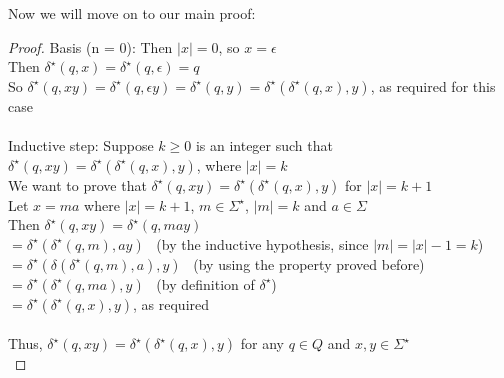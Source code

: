 \documentclass{article}
\begin{document}
Now we will move on to our main proof:
\begin{proof}
Basis (n = 0): Then $|x| = 0$, so $x = \epsilon$\\
Then $\delta^\star(q, x) = \delta^\star(q, \epsilon ) = q$\\
So $\delta^\star(q, xy) = \delta^\star(q, \epsilon y) = \delta^\star(q, y) = \delta^\star(\delta^\star(q, x), y)$, as required for this case\\ \\
Inductive step: Suppose $k \ge 0$ is an integer such that $\delta^\star(q, xy) = \delta^\star(\delta^\star(q, x), y)$, where $|x| = k$\\
We want to prove that $\delta^\star(q, xy) = \delta^\star(\delta^\star(q, x), y)$ for $|x| = k+1$\\
Let $x = ma$ where $|x| = k+1$, $m \in \Sigma^\star$, $|m| = k$ and $a \in \Sigma$\\
Then $\delta^\star(q, xy) = \delta^\star(q, may)$\\
$= \delta^\star(\delta^\star(q, m), ay)$ \ (by the inductive hypothesis, since $|m| = |x|-1 = k$)\\
$= \delta^\star(\delta(\delta^\star(q, m), a), y)$ \ (by using the property proved before)\\
$ = \delta^\star(\delta^\star(q, ma), y)$ \ (by definition of $\delta^\star$)\\
$= \delta^\star(\delta^\star(q, x), y)$, as required\\ \\
Thus, $\delta^\star(q, xy) = \delta^\star(\delta^\star(q, x), y)$
for any $q \in Q$ and $x, y \in \Sigma^\star$\\
\end{proof}
\end{document}
